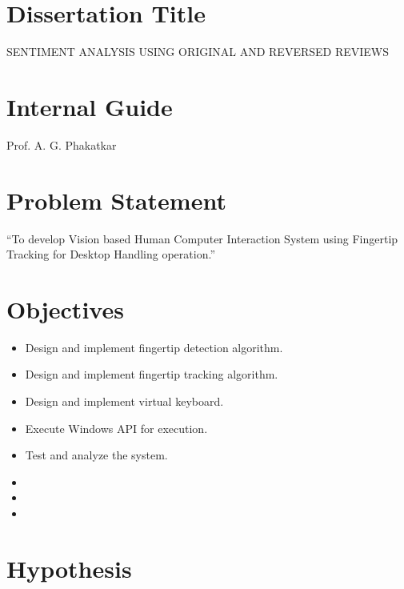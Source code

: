 \documentclass[oneside,a4paper,12pt]{pictreport}
\begin{document}
\section{Dissertation Title}
SENTIMENT ANALYSIS USING ORIGINAL AND REVERSED REVIEWS



\section{Internal Guide}
Prof. A. G. Phakatkar



\section{Problem Statement}
\label{sec:problem_def}
``To develop Vision based Human Computer Interaction System using Fingertip Tracking for Desktop Handling operation.''

\section{Objectives}
\begin{itemize}
    \item Design and implement fingertip detection algorithm. 
    \item Design and implement fingertip tracking algorithm. 
    \item Design and implement virtual keyboard. 
    \item Execute Windows API for execution. 
    \item Test and analyze the system. 
    \item 
    \item 
    \item 
\end{itemize}

\section{Hypothesis}
\end{document}
